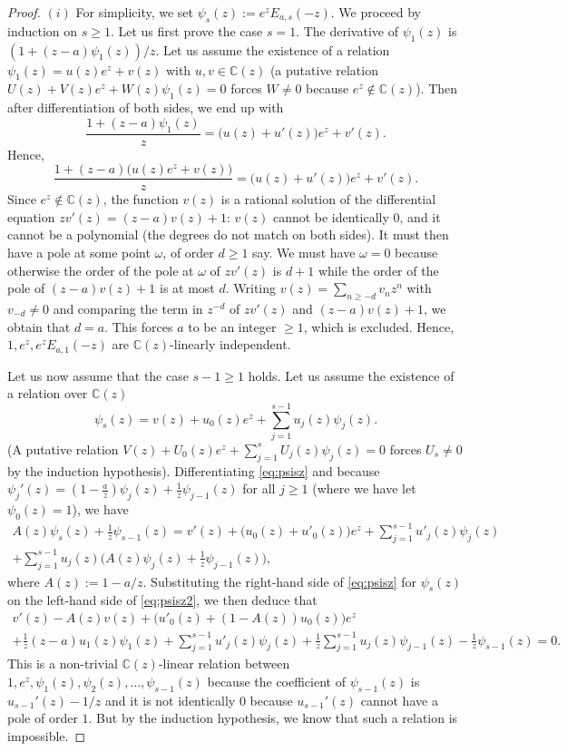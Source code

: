 \documentclass[reqno,12pt]{article}
\numberwithin{equation}{section}
\theoremstyle{remark}
\begin{document}
\begin{proof} $(i)$ For simplicity, we set  $\psi_s(z):=e^zE_{a,s}(-z)$. We proceed by induction on $s\ge 1$. Let us first prove the case $s=1$. The derivative of $\psi_1(z)$ is $(1+(z-a)\psi_1(z))/z$. Let us assume the existence of a relation $\psi_1(z)=u(z)e^z+v(z)$ with $u,v\in \mathbb C(z)$ (a putative relation $U(z)+V(z)e^z+W(z)\psi_1(z)=0$ forces $W\neq 0$ because $e^z\notin \mathbb C(z)$). Then after differentiation of both sides, we end up with 
$$
\frac{1+(z-a)\psi_1(z)}{z}=\big(u(z)+u'(z)\big)e^z+v'(z).
$$
Hence, 
$$
\frac{1+(z-a)\big(u(z)e^z+v(z)\big)}{z}=\big(u(z)+u'(z)\big)e^z+v'(z).
$$
Since $e^z\notin \mathbb C(z)$, the function $v(z)$ is a rational solution of the differential equation $zv'(z)=(z-a)v(z)+1$: $v(z)$ cannot be identically 0, and it cannot be a polynomial (the degrees do not match on both sides). It must then have a pole at some point $\omega$, of order $d\ge 1$ say. We must have $\omega=0$ because otherwise the order of the pole at $\omega$ of $zv'(z)$ is $d+1$ while the order of the pole of $(z-a)v(z)+1$ is at most $d$. Writing $v(z)=\sum_{n\ge -d} v_nz^n$ with $v_{-d}\neq 0$ and comparing the term in $z^{-d}$ of $zv'(z)$ and $(z-a)v(z)+1$, we obtain that $d=a$. This forces $a$ to be an integer $\ge 1$, which is excluded. Hence, $1, e^z, e^zE_{a,1}(-z)$ are $\mathbb C(z)$-linearly independent.
\medskip

Let us now assume that the case $s-1\ge 1$ holds. Let us assume the existence of a relation over $\mathbb C(z)$
\begin{equation} \label{eq:psisz}
    \psi_s(z)=v(z)+u_0(z)e^z+\sum_{j=1}^{s-1} u_j(z)\psi_j(z).
\end{equation}
(A putative relation $V(z)+U_0(z)e^z+\sum_{j=1}^{s}U_j(z)\psi_j(z)=0$ forces $U_s\neq 0$ by the induction hypothesis). Differentiating \eqref{eq:psisz} and because 
 $\psi_j'(z)=(1-\frac{a}{z})\psi_j(z)+\frac{1}{z}\psi_{j-1}(z)$
for all $j\ge 1$ (where we have let $\psi_0(z)=1 $), we have 
\begin{multline} \label{eq:psisz2}
  A(z)\psi_s(z)+\frac{1}{z}\psi_{s-1}(z) =
   v'(z)+\big(u_0(z)+u'_0(z)\big)e^z
   +\sum_{j=1}^{s-1}u'_j(z)\psi_j(z)\\
+\sum_{j=1}^{s-1}u_j(z)\big(A(z)\psi_j(z)+\frac{1}{z}\psi_{j-1}(z)\big), 
\end{multline}
where $A(z):=1-a/z$. 
Substituting the right-hand side of \eqref{eq:psisz} for $\psi_s(z)$ on the left-hand side of \eqref{eq:psisz2}, we then deduce that
\begin{multline*}
    v'(z)-A(z)v(z)+\big(u'_0(z)
    +(1-A(z)) u_0(z) \big)e^z\\
    +\frac{1}{z}(z-a)u_1(z)\psi_1(z)+\sum_{j=1}^{s-1}u'_j(z)\psi_{j}(z)+\frac{1}{z}\sum_{j=1}^{s-1} u_j(z)\psi_{j-1}(z)
-\frac{1}{z}\psi_{s-1}(z) =0.
\end{multline*}
This is  a  non-trivial $\mathbb C(z)$-linear relation between 
$ 1, e^z, \psi_1(z), \psi_2(z), \ldots, \psi_{s-1}(z) $ because the coefficient of $\psi_{s-1}(z)$ is $u_{s-1}'(z)-1/z$ and it is  not identically 0 because $u_{s-1}'(z)$ cannot have a pole of order $1$. But by the induction hypothesis, we know that such a relation is impossible. 


\end{proof}
\end{document}

